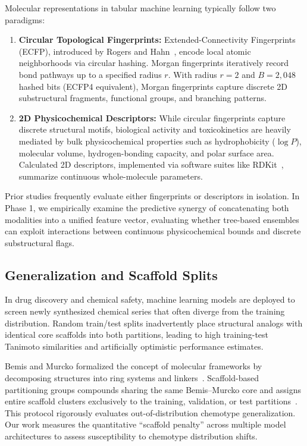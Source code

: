Molecular representations in tabular machine learning typically follow two paradigms:
\begin{enumerate}
    \item \textbf{Circular Topological Fingerprints:} Extended-Connectivity Fingerprints (ECFP), introduced by Rogers and Hahn~\cite{rogers2010extended}, encode local atomic neighborhoods via circular hashing. Morgan fingerprints iteratively record bond pathways up to a specified radius $r$. With radius $r=2$ and $B=2{,}048$ hashed bits (ECFP4 equivalent), Morgan fingerprints capture discrete 2D substructural fragments, functional groups, and branching patterns.
    \item \textbf{2D Physicochemical Descriptors:} While circular fingerprints capture discrete structural motifs, biological activity and toxicokinetics are heavily mediated by bulk physicochemical properties such as hydrophobicity ($\log P$), molecular volume, hydrogen-bonding capacity, and polar surface area. Calculated 2D descriptors, implemented via software suites like RDKit~\cite{landrum2013rdkit}, summarize continuous whole-molecule parameters.
\end{enumerate}
Prior studies frequently evaluate either fingerprints or descriptors in isolation. In Phase 1, we empirically examine the predictive synergy of concatenating both modalities into a unified feature vector, evaluating whether tree-based ensembles can exploit interactions between continuous physicochemical bounds and discrete substructural flags.

\subsection{Generalization and Scaffold Splits}

In drug discovery and chemical safety, machine learning models are deployed to screen newly synthesized chemical series that often diverge from the training distribution. Random train/test splits inadvertently place structural analogs with identical core scaffolds into both partitions, leading to high training-test Tanimoto similarities and artificially optimistic performance estimates.

Bemis and Murcko formalized the concept of molecular frameworks by decomposing structures into ring systems and linkers~\cite{bemis1996properties}. Scaffold-based partitioning groups compounds sharing the same Bemis--Murcko core and assigns entire scaffold clusters exclusively to the training, validation, or test partitions~\cite{wu2018moleculenet}. This protocol rigorously evaluates out-of-distribution chemotype generalization. Our work measures the quantitative ``scaffold penalty'' across multiple model architectures to assess susceptibility to chemotype distribution shifts.


